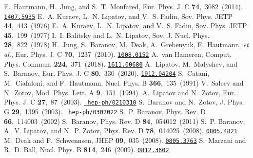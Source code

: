 \documentclass[11pt]{article} \usepackage{mystyle-new}
\begin{document}
\begin{mcbibliography}{10}
F.~Hautmann, H.~Jung, and S.~T. Monfared,
\newblock Eur. Phys. J. C{} {\bf 74},~3082~(2014).
\newblock \href{http://www.arXiv.org/abs/1407.5935}{{\tt 1407.5935}}\relax
\relax
{}
E.~A. Kuraev, L.~N. Lipatov, and V.~S. Fadin,
\newblock Sov. Phys. JETP{} {\bf 44},~443~(1976)\relax
\relax
{}
E.~A. Kuraev, L.~N. Lipatov, and V.~S. Fadin,
\newblock Sov. Phys. JETP{} {\bf 45},~199~(1977)\relax
\relax
{}
I.~I. Balitsky and L.~N. Lipatov,
\newblock Sov. J. Nucl. Phys.{} {\bf 28},~822~(1978)\relax
\relax
{}
H.~Jung, S.~Baranov, M.~Deak, A.~Grebenyuk, F.~Hautmann, {\em et al.},
\newblock Eur. Phys. J. C{} {\bf 70},~1237~(2010).
\newblock \href{http://www.arXiv.org/abs/1008.0152}{{\tt 1008.0152}}\relax
\relax
{}
A.~van Hameren,
\newblock Comput. Phys. Commun.{} {\bf 224},~371~(2018).
\newblock \href{http://www.arXiv.org/abs/1611.00680}{{\tt 1611.00680}}\relax
\relax
{}
A.~Lipatov, M.~Malyshev, and S.~Baranov,
\newblock Eur. Phys. J. C{} {\bf 80},~330~(2020).
\newblock \href{http://www.arXiv.org/abs/1912.04204}{{\tt 1912.04204}}\relax
\relax
{}
S.~Catani, M.~Ciafaloni, and F.~Hautmann,
\newblock Nucl. Phys. B{} {\bf 366},~135~(1991)\relax
\relax
{}
V.~Saleev and N.~Zotov,
\newblock Mod. Phys. Lett. A{} {\bf 9},~151~(1994).
\relax
\relax
{}
A.~Lipatov and N.~Zotov,
\newblock Eur. Phys. J. C{} {\bf 27},~87~(2003).
\newblock \href{http://www.arXiv.org/abs/hep-ph/0210310}{{\tt
  hep-ph/0210310}}\relax
\relax
{}
S.~Baranov and N.~Zotov,
\newblock J. Phys. G{} {\bf 29},~1395~(2003).
\newblock \href{http://www.arXiv.org/abs/hep-ph/0302022}{{\tt
  hep-ph/0302022}}\relax
\relax
{}
S.~P. Baranov,
\newblock Phys. Rev. D{} {\bf 66},~114003~(2002)\relax
\relax
{}
S.~Baranov,
\newblock Phys. Rev. D{} {\bf 84},~054012~(2011)\relax
\relax
{}
S.~P. Baranov, A.~V. Lipatov, and N.~P. Zotov,
\newblock Phys. Rev. D{} {\bf 78},~014025~(2008).
\newblock \href{http://www.arXiv.org/abs/0805.4821}{{\tt 0805.4821}}\relax
\relax
{}
M.~Deak and F.~Schwennsen,
\newblock JHEP{} {\bf 09},~035~(2008).
\newblock \href{http://www.arXiv.org/abs/0805.3763}{{\tt 0805.3763}}\relax
\relax
{}
S.~Marzani and R.~D. Ball,
\newblock Nucl. Phys. B{} {\bf 814},~246~(2009).
\newblock \href{http://www.arXiv.org/abs/0812.3602}{{\tt 0812.3602}}\relax

\end{mcbibliography}
\end{document}
